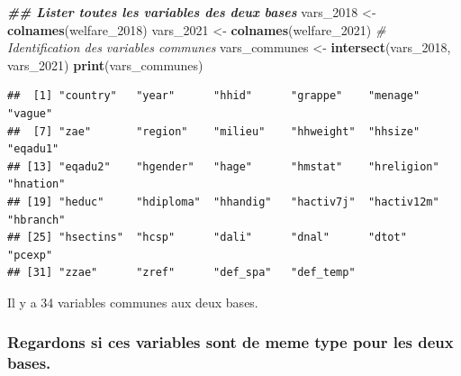 \documentclass[
]{article}
\newenvironment{Shaded}{\begin{snugshade}}{\end{snugshade}}
\newcommand{\CommentTok}[1]{\textcolor[rgb]{0.56,0.35,0.01}{\textit{#1}}}
\newcommand{\DocumentationTok}[1]{\textcolor[rgb]{0.56,0.35,0.01}{\textbf{\textit{#1}}}}
\newcommand{\FunctionTok}[1]{\textcolor[rgb]{0.13,0.29,0.53}{\textbf{#1}}}
\newcommand{\NormalTok}[1]{#1}
\newcommand{\OtherTok}[1]{\textcolor[rgb]{0.56,0.35,0.01}{#1}}
\begin{document}
\begin{Shaded}
\begin{Highlighting}[]
\DocumentationTok{\#\# Lister toutes les variables des deux bases}
\NormalTok{vars\_2018 }\OtherTok{\textless{}{-}} \FunctionTok{colnames}\NormalTok{(welfare\_2018)}
\NormalTok{vars\_2021 }\OtherTok{\textless{}{-}} \FunctionTok{colnames}\NormalTok{(welfare\_2021)}
\CommentTok{\# Identification des variables communes}
\NormalTok{vars\_communes }\OtherTok{\textless{}{-}} \FunctionTok{intersect}\NormalTok{(vars\_2018, vars\_2021)}
\FunctionTok{print}\NormalTok{(vars\_communes)}
\end{Highlighting}
\end{Shaded}

\begin{verbatim}
##  [1] "country"   "year"      "hhid"      "grappe"    "menage"    "vague"    
##  [7] "zae"       "region"    "milieu"    "hhweight"  "hhsize"    "eqadu1"   
## [13] "eqadu2"    "hgender"   "hage"      "hmstat"    "hreligion" "hnation"  
## [19] "heduc"     "hdiploma"  "hhandig"   "hactiv7j"  "hactiv12m" "hbranch"  
## [25] "hsectins"  "hcsp"      "dali"      "dnal"      "dtot"      "pcexp"    
## [31] "zzae"      "zref"      "def_spa"   "def_temp"
\end{verbatim}

Il y a 34 variables communes aux deux bases.

\hypertarget{regardons-si-ces-variables-sont-de-meme-type-pour-les-deux-bases.}{%
\subsubsection{Regardons si ces variables sont de meme type pour les
deux
bases.}\label{regardons-si-ces-variables-sont-de-meme-type-pour-les-deux-bases.}}
\end{document}
